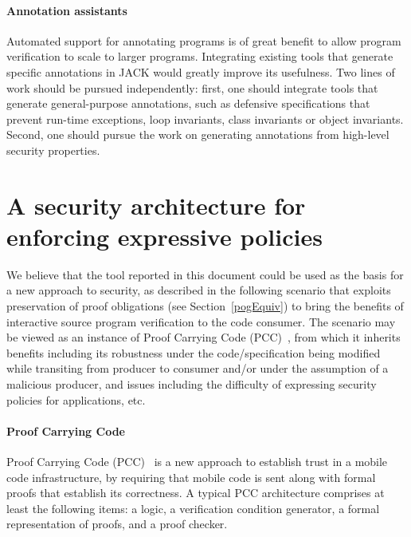 \paragraph{Annotation assistants}
Automated support for annotating programs is of great benefit to allow
program verification to scale to larger programs. Integrating existing
tools that generate specific annotations in JACK would greatly improve
its usefulness. Two lines of work should be pursued independently:
first, one should integrate tools that generate general-purpose
annotations, such as defensive specifications that prevent run-time
exceptions, loop invariants, class invariants or object invariants.
Second, one should pursue the work on generating annotations from 
high-level security properties.

\section{A security architecture for enforcing expressive policies}
We believe that the tool reported in this document could be used as
the basis for a new approach to security, as described in the
following scenario that exploits preservation of proof obligations
(see Section~\ref{pogEquiv}) to bring the benefits of interactive
source program verification to the code consumer. The scenario may be
viewed as an instance of Proof Carrying Code (PCC)~\cite{nec97:popl},
from which it inherits benefits including its robustness under the
code/specification being modified while transiting from producer to
consumer and/or under the assumption of a malicious producer, and
issues including the difficulty of expressing security policies for
applications, etc.

\paragraph*{Proof Carrying Code}
Proof Carrying Code (PCC)~\cite{nec97:popl} is a new approach to
establish trust in a mobile code infrastructure, by requiring that
mobile code is sent along with formal proofs that establish its
correctness.  A typical PCC architecture comprises at least the
following items: a logic, a verification condition generator, a formal
representation of proofs, and a proof checker.


